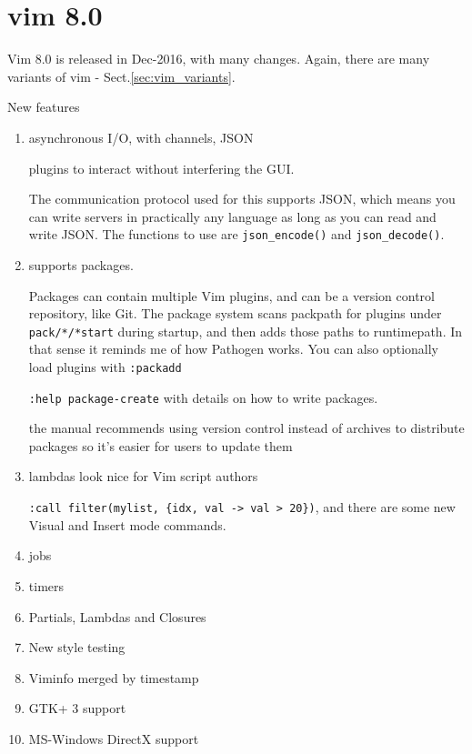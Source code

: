 {\begin{verbatim}
\end{verbatim}}


\section{vim 8.0}
\label{sec:vim-8.0}

Vim 8.0 is released in Dec-2016, with many changes. Again, there are many variants of vim - Sect.\ref{sec:vim_variants}.

New features
\begin{enumerate}
  \item asynchronous I/O, with channels, JSON 
  
  plugins to interact without interfering the GUI.
  
  The communication protocol used for this supports JSON, which means you can
  write servers in practically any language as long as you can read and write JSON.
  The functions to use are \verb!json_encode()! and \verb|json_decode()|.
  
  \item supports packages. 
  
  Packages can contain multiple Vim plugins, and can be a version control
  repository, like Git. The package system scans packpath for plugins under
  \verb!pack/*/*start! during startup, and then adds those paths to runtimepath.
  In that sense it reminds me of how Pathogen works. You can also optionally load
  plugins with \verb!:packadd!
  
  \verb!:help package-create! with details on how to write packages.
  
  the manual recommends using version control instead of archives to distribute
  packages so it's easier for users to update them
  
  \item lambdas look nice for Vim script authors 
  
  \verb!:call filter(mylist, {idx, val -> val > 20})!, and there are some new
  Visual and Insert mode commands.
  
  \item jobs
  
  \item timers
  
  \item Partials, Lambdas and Closures
  
  \item New style testing 
  
  \item Viminfo merged by timestamp 
  
  \item GTK+ 3 support 
  
  \item MS-Windows DirectX support 
  
\end{enumerate}

